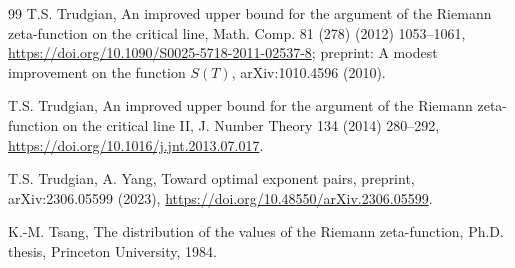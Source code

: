 \documentclass[preprint,12pt]{elsarticle}
\numberwithin{equation}{section}
\theoremstyle{plain}
\theoremstyle{definition}
\theoremstyle{remark}
\begin{document}
\begin{thebibliography}{99}
T.S. Trudgian, An improved upper bound for the argument of the Riemann zeta-function on the critical line, Math. Comp. 81 (278) (2012) 1053--1061, \href{https://doi.org/10.1090/S0025-5718-2011-02537-8}{https://doi.org/10.1090/S0025-5718-2011-02537-8}; preprint: A modest improvement on the function $S(T)$, arXiv:1010.4596 (2010).

T.S. Trudgian, An improved upper bound for the argument of the Riemann zeta-function on the critical line II, J. Number Theory 134 (2014) 280--292, \href{https://doi.org/10.1016/j.jnt.2013.07.017}{https://doi.org/10.1016/j.jnt.2013.07.017}.

T.S. Trudgian, A. Yang, Toward optimal exponent pairs, preprint, arXiv:2306.05599 (2023), \href{https://doi.org/10.48550/arXiv.2306.05599}{https://doi.org/10.48550/arXiv.2306.05599}.

K.-M. Tsang, The distribution of the values of the Riemann zeta-function, Ph.D. thesis, Princeton University, 1984.

\end{thebibliography}
\end{document}
